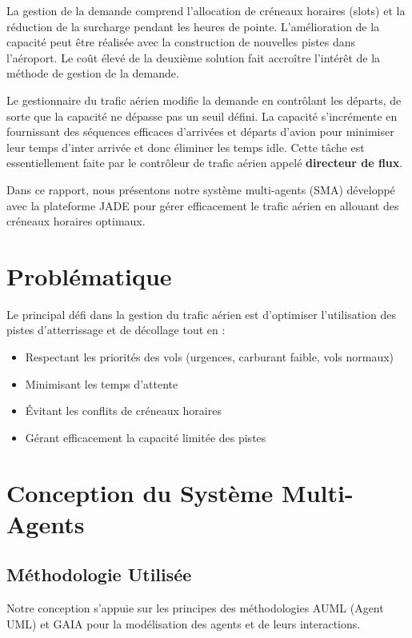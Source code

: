 \documentclass[12pt,a4paper]{article}
\begin{document}
La gestion de la demande comprend l'allocation de créneaux horaires (slots) et la réduction de la surcharge pendant les heures de pointe. L'amélioration de la capacité peut être réalisée avec la construction de nouvelles pistes dans l'aéroport. Le coût élevé de la deuxième solution fait accroître l'intérêt de la méthode de gestion de la demande.

Le gestionnaire du trafic aérien modifie la demande en contrôlant les départs, de sorte que la capacité ne dépasse pas un seuil défini. La capacité s'incrémente en fournissant des séquences efficaces d'arrivées et départs d'avion pour minimiser leur temps d'inter arrivée et donc éliminer les temps idle. Cette tâche est essentiellement faite par le contrôleur de trafic aérien appelé \textbf{directeur de flux}.

Dans ce rapport, nous présentons notre système multi-agents (SMA) développé avec la plateforme JADE pour gérer efficacement le trafic aérien en allouant des créneaux horaires optimaux.

\section{Problématique}

Le principal défi dans la gestion du trafic aérien est d'optimiser l'utilisation des pistes d'atterrissage et de décollage tout en :
\begin{itemize}
    \item Respectant les priorités des vols (urgences, carburant faible, vols normaux)
    \item Minimisant les temps d'attente
    \item Évitant les conflits de créneaux horaires
    \item Gérant efficacement la capacité limitée des pistes
\end{itemize}

\section{Conception du Système Multi-Agents}

\subsection{Méthodologie Utilisée}

Notre conception s'appuie sur les principes des méthodologies AUML (Agent UML) et GAIA pour la modélisation des agents et de leurs interactions.
\end{document}
